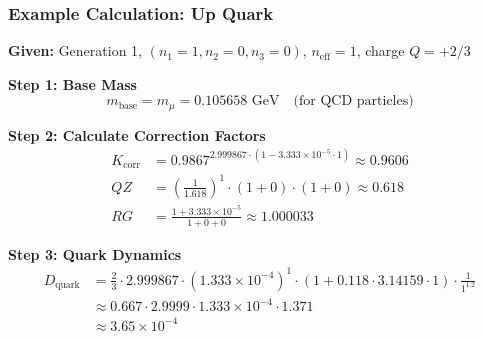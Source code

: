 	\begin{table}[h]
		\centering
		\small
		\caption{Quantum numbers systematics in the fractal method}
		\label{tab:qn_fractal}
	\end{table}
	
	\subsubsection{Example Calculation: Up Quark}
	
	\textbf{Given:} Generation 1, $(n_1=1, n_2=0, n_3=0)$, $n_{\text{eff}}=1$, charge $Q=+2/3$
	
	\textbf{Step 1: Base Mass}
	\begin{equation}
		m_{\text{base}} = m_\mu = 0.105658 \text{ GeV} \quad \text{(for QCD particles)}
	\end{equation}
	
	\textbf{Step 2: Calculate Correction Factors}
	\begin{align}
		K_{\text{corr}} &= 0.9867^{2.999867 \cdot (1 - 3.333 \times 10^{-5} \cdot 1)} \approx 0.9606 \\
		QZ &= \left(\frac{1}{1.618}\right)^1 \cdot (1 + 0) \cdot (1 + 0) \approx 0.618 \\
		RG &= \frac{1 + 3.333 \times 10^{-5}}{1 + 0 + 0} \approx 1.000033
	\end{align}
		
	\textbf{Step 3: Quark Dynamics}
	\begin{align}
		D_{\text{quark}} &= \frac{2}{3} \cdot 2.999867 \cdot (1.333 \times 10^{-4})^1 \cdot (1 + 0.118 \cdot 3.14159 \cdot 1) \cdot \frac{1}{1^{1.2}} \\
		&\approx 0.667 \cdot 2.9999 \cdot 1.333 \times 10^{-4} \cdot 1.371 \\
		&\approx 3.65 \times 10^{-4}
	\end{align}
	
